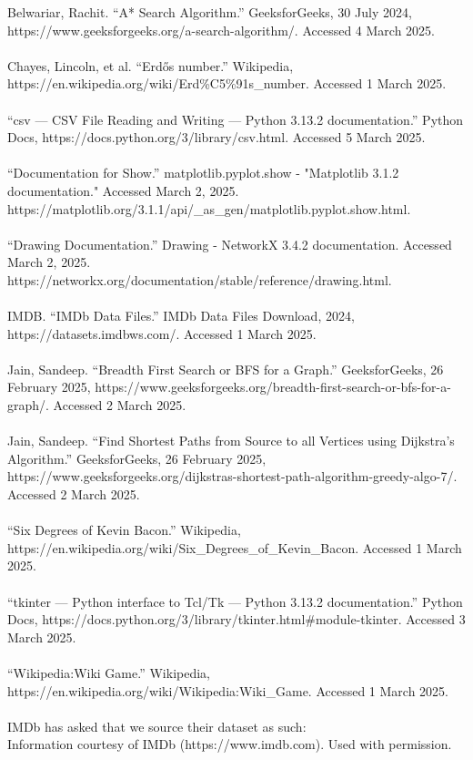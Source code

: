 \documentclass{article}
\begin{document}
Belwariar, Rachit. “A* Search Algorithm.” GeeksforGeeks, 30 July 2024, https://www.geeksforgeeks.org/a-search-algorithm/. Accessed 4 March 2025.\\\\
Chayes, Lincoln, et al. “Erdős number.” Wikipedia, https://en.wikipedia.org/wiki/Erd\%C5\%91s\_number. Accessed 1 March 2025.\\\\
“csv — CSV File Reading and Writing — Python 3.13.2 documentation.” Python Docs, https://docs.python.org/3/library/csv.html. Accessed 5 March 2025.\\\\
“Documentation for Show.” matplotlib.pyplot.show - "Matplotlib 3.1.2 documentation." Accessed March 2, 2025. https://matplotlib.org/3.1.1/api/\_as\_gen/matplotlib.pyplot.show.html.\\\\
“Drawing Documentation.” Drawing - NetworkX 3.4.2 documentation. Accessed March 2, 2025. https://networkx.org/documentation/stable/reference/drawing.html.\\\\
IMDB. “IMDb Data Files.” IMDb Data Files Download, 2024, https://datasets.imdbws.com/. Accessed 1 March 2025.\\\\
Jain, Sandeep. “Breadth First Search or BFS for a Graph.” GeeksforGeeks, 26 February 2025, https://www.geeksforgeeks.org/breadth-first-search-or-bfs-for-a-graph/. Accessed 2 March 2025.\\\\
Jain, Sandeep. “Find Shortest Paths from Source to all Vertices using Dijkstra's Algorithm.” GeeksforGeeks, 26 February 2025, https://www.geeksforgeeks.org/dijkstras-shortest-path-algorithm-greedy-algo-7/. Accessed 2 March 2025.\\\\
“Six Degrees of Kevin Bacon.” Wikipedia, https://en.wikipedia.org/wiki/Six\_Degrees\_of\_Kevin\_Bacon. Accessed 1 March 2025.\\\\
“tkinter — Python interface to Tcl/Tk — Python 3.13.2 documentation.” Python Docs, https://docs.python.org/3/library/tkinter.html\#module-tkinter. Accessed 3 March 2025.\\\\
“Wikipedia:Wiki Game.” Wikipedia, https://en.wikipedia.org/wiki/Wikipedia:Wiki\_Game. Accessed 1 March 2025.\\\\
IMDb has asked that we source their dataset as such:\\
Information courtesy of
IMDb
(https://www.imdb.com).
Used with permission.
\end{document}
